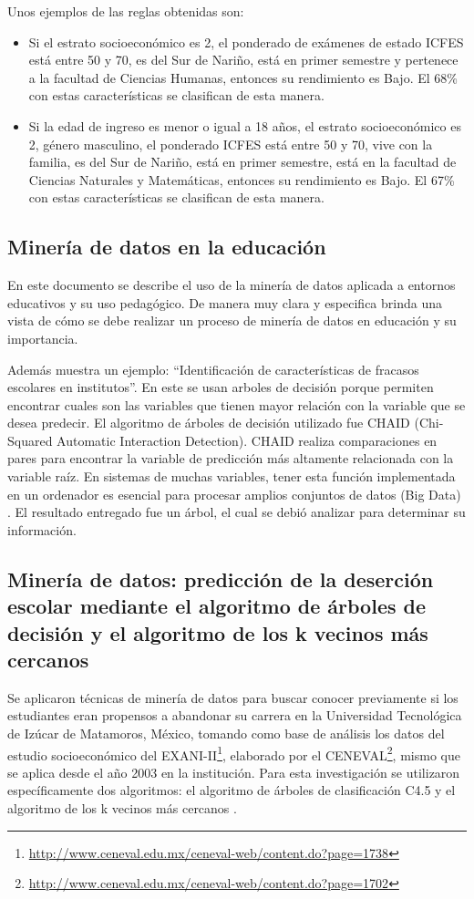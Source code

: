 Unos ejemplos de las reglas obtenidas son:
\begin{itemize}
\item Si el estrato socioeconómico es 2, el ponderado de exámenes de estado ICFES está entre 50 y 70, es del Sur de Nariño, está en primer semestre y pertenece a la facultad de Ciencias Humanas, entonces su rendimiento es Bajo. El 68\% con estas características se clasifican de esta manera. 
\item Si la edad de ingreso es menor o igual a 18 años, el estrato socioeconómico es 2, género masculino, el ponderado ICFES está entre 50 y 70, vive con la familia, es del Sur de Nariño, está en primer semestre, está en la facultad de Ciencias Naturales y Matemáticas, entonces su rendimiento es Bajo. El 67\% con estas características se clasifican de esta manera. 
\end{itemize}
\subsection{Minería de datos en la educación \cite{key-110}}
En este documento se describe el uso de la minería de datos aplicada a entornos educativos y su uso pedagógico. De manera muy clara y especifica brinda una vista de cómo se debe realizar un proceso de minería de datos en educación y su importancia.

Además muestra un ejemplo: ``Identificación de características de fracasos escolares en institutos''. En este se usan arboles de decisión porque permiten encontrar cuales son las variables que tienen mayor relación con la variable que se desea predecir. El algoritmo de árboles de decisión utilizado fue CHAID \cite{key-120} (Chi-Squared Automatic Interaction Detection). CHAID realiza comparaciones en pares para encontrar la variable de predicción más altamente relacionada con la variable raíz. En sistemas de muchas variables, tener esta función implementada en un ordenador es esencial para procesar amplios conjuntos de datos (Big Data) \cite{key-110}. El resultado entregado fue un árbol, el cual se debió analizar para determinar su información.
\subsection{Minería de datos: predicción de la deserción escolar mediante el algoritmo de árboles de decisión y el algoritmo de los k vecinos más cercanos \cite{key-130}}
Se aplicaron técnicas de minería de datos para buscar conocer previamente si los estudiantes eran propensos a abandonar su carrera en la Universidad Tecnológica de Izúcar de Matamoros, México, tomando como base de análisis los datos del estudio socioeconómico del EXANI-II\footnote{\url{http://www.ceneval.edu.mx/ceneval-web/content.do?page=1738}}, elaborado por el CENEVAL\footnote{\url{http://www.ceneval.edu.mx/ceneval-web/content.do?page=1702}}, mismo que se aplica desde el año 2003 en la institución. Para esta investigación se utilizaron específicamente dos algoritmos: el algoritmo de árboles de clasificación C4.5 y el algoritmo de los k vecinos más cercanos \cite{key-70}.

